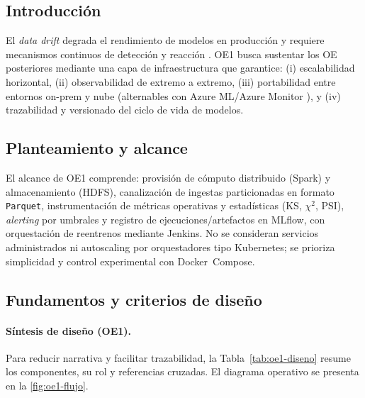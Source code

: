 \subsection{Introducción}
El \textit{data drift} degrada el rendimiento de modelos en producción y requiere mecanismos continuos de detección y reacción \citep{Gama2014,Lu2019,Chawla2021}. OE1 busca sustentar los OE posteriores mediante una capa de infraestructura que garantice: (i) escalabilidad horizontal, (ii) observabilidad de extremo a extremo, (iii) portabilidad entre entornos on-prem y nube (alternables con Azure ML/Azure Monitor \citep{Berberi2025,Bhatt2025,AzureML2023,AzureMonitor2022}), y (iv) trazabilidad y versionado del ciclo de vida de modelos.

\subsection{Planteamiento y alcance}
El alcance de OE1 comprende: provisión de cómputo distribuido (Spark) y almacenamiento (HDFS), canalización de ingestas particionadas en formato \texttt{Parquet}, instrumentación de métricas operativas y estadísticas (KS, $\chi^2$, PSI), \textit{alerting} por umbrales y registro de ejecuciones/artefactos en MLflow, con orquestación de reentrenos mediante Jenkins. No se consideran servicios administrados ni autoscaling por orquestadores tipo Kubernetes; se prioriza simplicidad y control experimental con Docker~Compose.

\subsection{Fundamentos y criterios de diseño}

\paragraph{Síntesis de diseño (OE1).}
Para reducir narrativa y facilitar trazabilidad, la Tabla~\ref{tab:oe1-diseno} resume los componentes, su rol y referencias cruzadas. El diagrama operativo se presenta en la \autoref{fig:oe1-flujo}.

